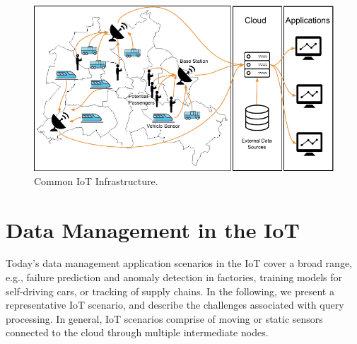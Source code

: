 \begin{figure}[h]
  \centering
  \includegraphics[width=\linewidth]{figs/iot_scenario}
  \caption{Common IoT Infrastructure.}
  \label{fig:iot-app-scenario}
\end{figure}
\section{Data Management in the IoT}
\label{iot}
% 
% 
Today's data management application scenarios in the IoT cover a broad range, e.g., failure prediction and anomaly detection in factories, training models for self-driving cars, or tracking of supply chains. 
In the following, we present a representative IoT scenario, and describe the challenges associated with query processing.
In general, IoT scenarios comprise of moving or static sensors connected to the cloud through multiple intermediate nodes.

